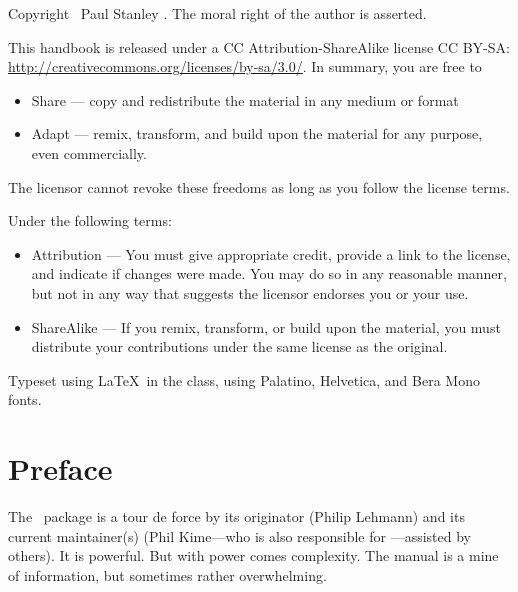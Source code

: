 \maketitle

\strut\vspace{10cm}

Copyright \textcopyright\ Paul Stanley \releasedate. The moral right of the author is asserted.

\vspace{2pc}

{\small
This handbook is released under a CC Attribution-ShareAlike license CC BY-SA: 
\url{http://creativecommons.org/licenses/by-sa/3.0/}. In summary, you are free to
\begin{itemize}
  \item Share --- copy and redistribute the material in any medium or format
  \item Adapt --- remix, transform, and build upon the material for any purpose, even commercially.
  \end{itemize}
The licensor cannot revoke these freedoms as long as you follow the license terms.

Under the following terms:
\begin{itemize}
\item Attribution --- You must give appropriate credit, provide a link to the license, and indicate if changes were made. You may do so in any reasonable manner, but not in any way that suggests the licensor endorses you or your use.
\item ShareAlike --- If you remix, transform, or build upon the material, you must distribute your contributions under the same license as the original.
\end{itemize}
}

\vspace{2pc}
Typeset using \LaTeX\ in the  class, using Palatino, Helvetica, and Bera Mono fonts.
\cleardoublepage


\tableofcontents

\chapter{Preface}

The \biblatex\ package is a tour de force by its originator (Philip
Lehmann) and its current maintainer(s) (Phil Kime---who is also
responsible for ---assisted by others). It is
powerful. But with power comes complexity. The manual is a mine of
information, but sometimes rather overwhelming.

